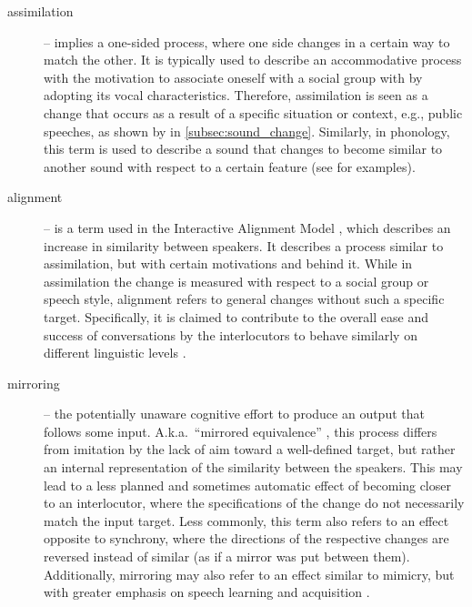 \begin{description}
	\item[assimilation] -- implies a one-sided process, where one side changes in a certain way to match the other.
	It is typically used to describe an accommodative process with the motivation to associate oneself with a social group with by adopting its vocal characteristics.
	Therefore, assimilation is seen as a change that occurs as a result of a specific situation or context, e.g., public speeches, as shown by \citet{Ohala1990phonetics} in \cref{subsec:sound_change}.
	Similarly, in phonology, this term is used to describe a sound that changes to become similar to another sound with respect to a certain feature (see \citet[][pp.\ 89-98]{Hall2011phonologie} for examples).
	
	\item[alignment] -- is a term used in the Interactive Alignment Model \citep{Pickering2004behavioral}, which describes an increase in similarity between speakers.
	It describes a process similar to assimilation, but with certain motivations and behind it.
	While in assimilation the change is measured with respect to a social group or speech style, alignment refers to general changes without such a specific target.
	Specifically, it is claimed to contribute to the overall ease and success of conversations by the interlocutors to behave similarly on different linguistic levels \citep{Garrod2009joint}.  
	
	\item[mirroring] -- the potentially unaware cognitive effort to produce an output that follows some input.
	A.k.a.\ \enquote{mirrored equivalence} \citep{Messum2015creating, Messum2007mirroring}, this process differs from imitation by the lack of aim toward a well-defined target, but rather an internal representation of the similarity between the speakers.
	This may lead to a less planned and sometimes automatic effect of becoming closer to an interlocutor, where the specifications of the change do not necessarily match the input target.
	Less commonly, this term also refers to an effect opposite to synchrony, where the directions of the respective changes are reversed instead of similar (as if a mirror was put between them).
	Additionally, mirroring may also refer to an effect similar to mimicry, but with greater emphasis on speech learning and acquisition \citep[e.g.,][]{Yoshikawa2003constructivist}.
	

\end{description}
